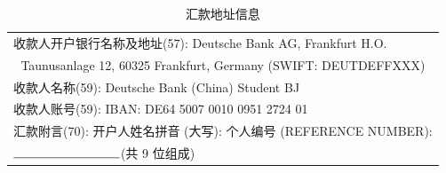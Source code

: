 \documentclass[oneside,final]{book}
\begin{document}
\begin{appendices}

\begin{table}
\caption{汇款地址信息}
\label{tb:address}
\begin{center}
\begin{tabular}{l}
\toprule
收款人开户银行名称及地址(57): Deutsche Bank AG, Frankfurt H.O. \\
\multicolumn{1}{c}{Taunusanlage 12, 60325 Frankfurt, Germany
 (SWIFT: DEUTDEFFXXX)} \\
收款人名称(59): Deutsche Bank (China) Student BJ \\
收款人账号(59): IBAN: DE64 5007 0010 0951 2724 01 \\
汇款附言(70): 开户人姓名拼音 (大写): \underline{\hspace*{3cm}} 个人编号 (REFERENCE NUMBER):\\
 $\rule{3cm}{0.15mm}$(共 9 位组成) \\ \bottomrule
\end{tabular}
\end{center}
\end{table}

\newpage


\end{appendices}
\end{document}
